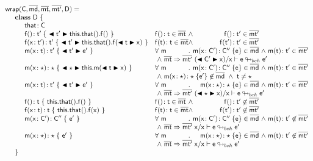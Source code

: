 \documentclass[a4paper,USenglish]{tex/lipics-v2016}
\begin{document}
\scriptsize
\newcommand{\bscast}[2]{\EM{\BehCast{#1}{{#2}}}}
\vspace{4mm}
\[\begin{array}{@{}ll@{}l@{}r@{~}c@{~}r}
    \wrap\C{\b\md}\bmt\bmtp\D = \\
\SP \class ~\D ~ \{\\
\SPP \Fdef\that\C \\
\SPP \Mdefz\f{\tp}{~\bscast\tp{\Get{\Get\this\that}\f}~}
&    \Mtype\f{}\t\in\bmt &\wedge& \Mtype\f{}\tp \in \bmtp
\\
\SPP \Mdef\f\x\tp\tp {~\bscast\tp{\Set{\Get\this\that}\f{\bscast\t\x}}~}
&    \Mtype\f\t\t \in \bmt &\wedge& \Mtype\f\tp\tp \in \bmtp
\\
\SPP \Mdef\m\x\t\tp {~\bscast\tp{{\ep}}~}
&     \All \m \Mdef\m\x\Cp\Cpp\e\in\b\md &\wedge& \Mtype\m\t\tp\in\bmtp \\
&\multicolumn{5}{l}{~\wedge~\rtranst{\bmt}\bmtp{(\bscast\Cp\x)}\x{\e}{\ep}}
\\
\SPP \Mdef\m\x\any\any {~\BehCast\any{\Call\this\m{\bscast{\t}\x}}~}
&     \All \m \Mdef\m\x\Cp\Cpp\e\in\b\md &\wedge& \Mtype\m\t\tp\in\bmtp\\
&\multicolumn{5}{l}{~\wedge~\Mdef\m\x\any\any{\e'}\not\in\b\md~\wedge~\t\neq\any}
\\
\SPP \Mdef\m\x\t\tp{~\bscast\tp{\ep}~}
&    \All \m \Mdef\m\x\any\any\e\in\b\md &\wedge& \Mtype\m\t\tp\in\bmtp \\
&\multicolumn{5}{l}{~\wedge~\rtranst{\bmt}\bmtp{(\bscast\any\x)}\x\e{\ep}}
\\
\SPP \Mdefz\f\t { ~\Get{\Get\this\that}\f~}
&    \Mtype\f{}\t \in \bmt &\wedge& \Mtype\f{}\tp \not\in \bmtp
\\
\SPP \Mdef\f\x\t\t { ~\Set{\Get\this\that}\f\x~}
&    \Mtype\f\t\t \in \bmt&\wedge& \Mtype\f\tp\tp \not\in \bmtp
\\
\SPP \Mdef\m\x{\Cp}{\Cpp} {~\ep~}
&    \All \m  \Mdef\m\x\Cp\Cpp\e\in\b\md &\wedge& \Mtype\m\t\tp\not\in \bmtp \\
&\multicolumn{5}{l}{~\wedge~\rtranst{\bmt}\bmtp\x\x{\e}{\ep}}
\\
\SPP \Mdef\m\x\any\any {~\ep~}
&    \All \m  \Mdef\m\x\any\any\e\in\b\md  &\wedge& \Mtype\m\t\tp\not\in\bmtp \\
&\multicolumn{5}{l}{~\wedge~\rtranst{\bmt}\bmtp\x\x{\e}{\ep}}
\\
\SP \}
\\

\end{array}\]
\end{document}
